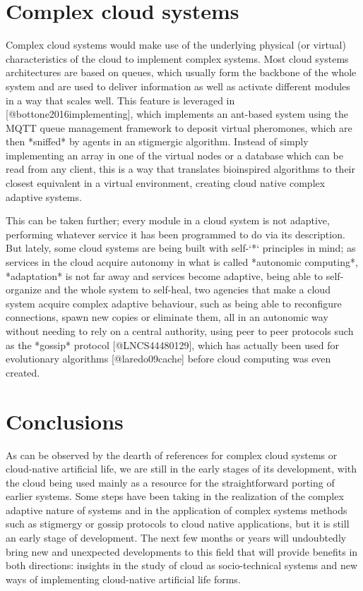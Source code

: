 \documentclass[utf8]{frontiersSCNS} %
\begin{document}
\section{Complex cloud systems }

Complex cloud systems would make use of the underlying physical (or virtual) characteristics of the cloud to implement complex systems. Most cloud systems architectures are based on queues, which usually form the backbone of the whole system and are used to deliver information as well as activate different modules in a way that scales well. This feature is leveraged in [@bottone2016implementing], which implements an ant-based system using the MQTT queue management framework to deposit virtual pheromones, which are then *sniffed* by agents in an stigmergic algorithm. Instead of simply implementing an array in one of the virtual nodes or a database which can be read from any client, this is a way that translates bioinspired algorithms to their closest equivalent in a virtual environment, creating cloud native complex adaptive systems.

This can be taken further; every module in a cloud system is not
adaptive, performing whatever service it has been programmed to do via
its description. But lately, some cloud systems are being built with
self-`*` principles in mind; as services in the cloud acquire autonomy
in what is called *autonomic computing*, *adaptation* is not far away
and services become adaptive, being able to self-organize and the
whole system to self-heal, two agencies that make a cloud system
acquire complex adaptive behaviour, such as being able to reconfigure
connections, spawn new copies or eliminate them, all in an autonomic
way without needing to rely on a central authority, using peer to peer
protocols such as the *gossip* protocol [@LNCS44480129], which has
actually been used for evolutionary algorithms [@laredo09cache] before
cloud computing was even created.

\section{Conclusions}

As can be observed by the dearth of references for complex cloud
systems or cloud-native artificial life, we are still in the early
stages of its development, with the cloud being used mainly as a
resource for the straightforward porting of earlier systems. Some
steps have been taking in the realization of the complex adaptive
nature of systems and in the application of complex systems methods
such as stigmergy or gossip protocols to cloud native applications,
but it is still an early stage of development. The next few months or
years will undoubtedly bring new and unexpected developments to this
field that will provide benefits in both directions: insights in the
study of cloud as socio-technical systems and new ways of implementing
cloud-native artificial life forms.
\end{document}

